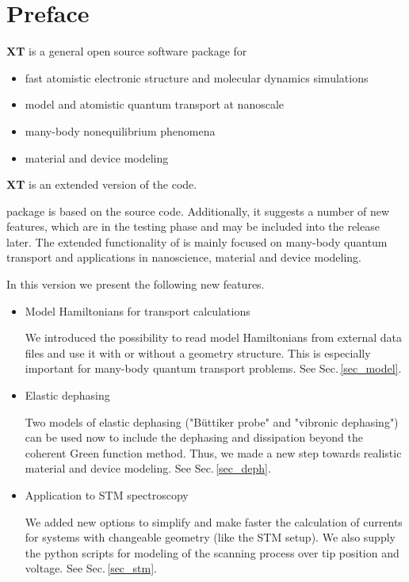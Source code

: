 {\new
\chapter*{Preface}

{\bf {\dftbp}XT} is a general open source software package for \\[-0.6cm]
\begin{itemize}
\item fast atomistic electronic structure and molecular dynamics simulations
\item model and atomistic quantum transport at nanoscale 
\item many-body nonequilibrium phenomena
\item material and device modeling
\end{itemize}  

{\bf {\dftbp}XT} is an extended version of the {\bf{\dftbp}} code.
 
{\dftbpxt} package \cite{DFTBXT} is based on the {\dftbp} \cite{dftbp-paper,Pecchia_NJP} source code. Additionally, it suggests a number of new features, which are in the testing phase and may be included into the \dftbp release later. The extended functionality of \dftbpxt is mainly focused on many-body quantum transport and applications in nanoscience, material and device modeling. 
 
\null
In this version we present the following new features.

\begin{itemize}

\item Model Hamiltonians for transport calculations

We introduced the possibility to read model Hamiltonians from external data files and use it with or without a geometry structure. This is especially important for many-body quantum transport problems. See Sec.\,\ref{sec_model}.
  
\item Elastic dephasing

Two models of elastic dephasing ("B\"uttiker probe" and "vibronic dephasing") can be used now to include the dephasing and dissipation    beyond the coherent Green function method. Thus, we made a new step towards realistic material and device modeling. See Sec.\,\ref{sec_deph}. 
  
\item Application to STM spectroscopy

We added new options to simplify and make faster the calculation of currents for systems with changeable geometry (like the STM setup). We also supply the python scripts for modeling of the scanning process over tip position and voltage. See Sec.\,\ref{sec_stm}.

\end{itemize}

}